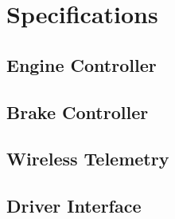 %
%
%
%

\section{Specifications}

\subsection{Engine Controller}
\subsection{Brake Controller}
\subsection{Wireless Telemetry}



\subsection{Driver Interface}
